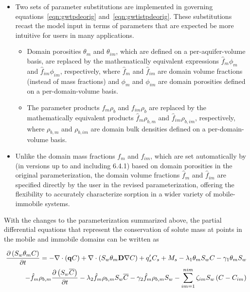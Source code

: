 \begin{itemize}
\item Two sets of parameter substitutions are implemented in governing equations~\ref{eqn:gwtpdeorig} and~\ref{eqn:gwtistpdeorig}. These substitutions recast the model input in terms of parameters that are expected be more intuitive for users in many applications.
  \begin{itemize}
  \item Domain porosities $\theta_{m}$ and $\theta_{im}$, which are defined on a per-aquifer-volume basis, are replaced by the mathematically equivalent expressions $\hat{f}_{m} \phi_{m}$ and $\hat{f}_{im} \phi_{im}$, respectively, where $\hat{f}_{m}$ and $\hat{f}_{im}$ are domain volume fractions (instead of mass fractions) and $\phi_{m}$ and $\phi_{im}$ are domain porosities defined on a per-domain-volume basis.
  \item The parameter products $f_{m} \rho_{b}$ and $f_{im} \rho_{b}$ are replaced by the mathematically equivalent products $\hat{f}_{m} \rho_{b, m}$ and $\hat{f}_{im} \rho_{b, im}$, respectively, where $\rho_{b, m}$ and $\rho_{b, im}$ are domain bulk densities defined on a per-domain-volume basis.
  \end{itemize}
\item Unlike the domain mass fractions $f_{m}$ and $f_{im}$, which are set automatically by \mf (in versions up to and including 6.4.1) based on domain porosities in the original parameterization, the domain volume fractions $\hat{f}_{m}$ and $\hat{f}_{im}$ are specified directly by the user in the revised parameterization, offering the flexibility to accurately characterize sorption in a wider variety of mobile-immobile systems.
\end{itemize}

With the changes to the parameterization summarized above, the partial differential equations that represent the conservation of solute mass at points in the mobile and immobile domains can be written as

\begin{equation}
\label{eqn:gwtpde}
\begin{aligned}
\frac {\partial \left ( S_w \theta_m C \right )}{\partial t} = 
- \nabla \cdot \left ( \mathbf{q} C  \right ) 
+ \nabla \cdot \left ( S_w \theta_m \mathbf{D} \nabla C \right ) 
+ q'_s C_s + M_s  
- \lambda_1 \theta_m S_w C - \gamma_1 \theta_m S_w \\
- \hat{f}_m \rho_{b,m} \frac {\partial \left ( S_w \overline{C} \right ) }{\partial t} 
- \lambda_2 \hat{f}_m \rho_{b,m} S_w \overline{C} - \gamma_2 \hat{f}_m \rho_{b,m} S_w 
- \sum \limits_{im=1}^{nim}  \zeta_{im} S_w \left ( C - C_{im} \right )
\end{aligned}
\end{equation}

